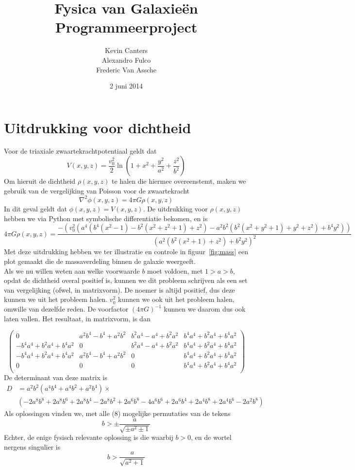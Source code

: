 \documentclass[11pt,a4paper,twoside,dutch]{article}
\title{Fysica van Galaxie\"en\\Programmeerproject}
\author{Kevin Canters \\ Alexandro Fulco \\ Frederic Van Assche}
\date{2 juni 2014}
\begin{document}


\section{Uitdrukking voor dichtheid}
Voor de triaxiale zwaartekrachtpotentiaal geldt dat
$$V(x,y,z) = \dfrac{v_0^2}{2}\ln \left( 1 + x^2 + \dfrac{y^2}{a^2} + \dfrac{z^2}{b^2}\right)$$
Om hieruit de dichtheid $\rho(x,y,z)$ te halen die hiermee overeenstemt, maken we gebruik van de vergelijking van Poisson voor de zwaartekracht
$$\nabla^2 \phi(x,y,z) = 4 \pi G \rho(x,y,z)$$
In dit geval geldt dat $\phi(x,y,z) = V(x,y,z)$. De uitdrukking voor $\rho(x,y,z)$ hebben we via Python met symbolische differentiatie bekomen, en is
$$4 \pi G \rho(x,y,z) = \dfrac{-(v_0^2 (a^4 (b^4 (x^2-1)-b^2 (x^2+z^2+1)+z^2)-a^2 b^2 (b^2 (x^2+y^2+1)+y^2+z^2)+b^4 y^2))}{(a^2 (b^2 (x^2+1)+z^2)+b^2 y^2)^2}$$
Met deze uitdrukking hebben we ter illustratie en controle in figuur~\ref{fig:mass} een plot gemaakt die de massaverdeling binnen de galaxie weergeeft.
\\

Als we nu willen weten aan welke voorwaarde $b$ moet voldoen, met $1 > a > b$, opdat de dichtheid overal positief is, kunnen we dit probleem schrijven als een set van vergelijking (ofwel, in matrixvorm). De noemer is altijd positief, dus deze kunnen we uit het probleem halen. $v_0^2$ kunnen we ook uit het probleem halen, omwille van dezelfde reden. De voorfactor $(4\pi G)^{-1}$ kunnen we daarom dus ook laten vallen. Het resultaat, in matrixvorm, is dan

\begin{equation*}\left(
\begin{array}{cccc}
 0 & a^2 b^4-b^4+a^2 b^2 & b^2 a^4-a^4+b^2 a^2 & b^4 a^4+b^2 a^4+b^4 a^2 \\
 -b^4 a^4+b^2 a^4+b^4 a^2 & 0 & b^2 a^4-a^4+b^2 a^2 & b^4 a^4+b^2 a^4+b^4 a^2 \\
 -b^4 a^4+b^2 a^4+b^4 a^2 & a^2 b^4-b^4+a^2 b^2 & 0 & b^4 a^4+b^2 a^4+b^4 a^2 \\
 0 & 0 & 0 & b^4 a^4+b^2 a^4+b^4 a^2 \\
\end{array}
\right)
\end{equation*}
De determinant van deze matrix is
\begin{align*}
D &= a^2 b^2 \left(a^4 b^4+a^4 b^2+a^2 b^4\right) \times \nonumber \\& \left(-2 a^8 b^8+2 a^8 b^6+2 a^8 b^4-2 a^8 b^2+2 a^6 b^8-4 a^6 b^6+2 a^6 b^4+2 a^4 b^8+2 a^4 b^6-2 a^2 b^8\right)
\end{align*}
Als oplossingen vinden we, met alle (8) mogelijke permutaties van de tekens
$$b > \pm \frac{a}{\sqrt{\pm a^2 \pm 1}}$$
Echter, de enige fysisch relevante oplossing is die waarbij $b > 0$, en de wortel nergens singulier is
$$b > \frac{a}{\sqrt{a^2 + 1}}$$
\end{document}
